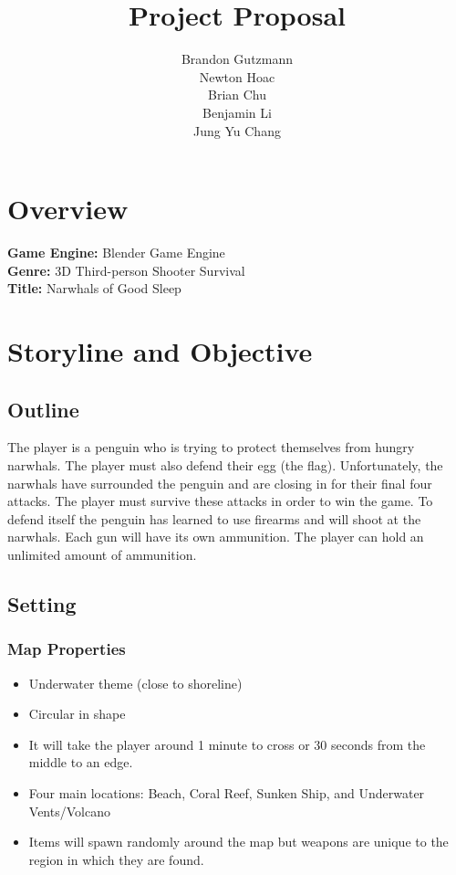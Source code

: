 \documentclass{article}
\title{Project Proposal}
\author{Brandon Gutzmann\\Newton Hoac\\Brian Chu\\Benjamin Li\\Jung Yu Chang}
\begin{document}
\maketitle
\tableofcontents
\section{Overview}
\textbf{Game Engine:} Blender Game Engine\\
\textbf{Genre:} 3D Third-person Shooter Survival\\
\textbf{Title:} Narwhals of Good Sleep

\section{Storyline and Objective}
\subsection{Outline}
The player is a penguin who is trying to protect themselves from hungry narwhals. The player must also defend their egg (the flag). Unfortunately, the narwhals have surrounded the penguin and are closing in for their final four attacks. The player must survive these attacks in order to win the game. To defend itself the penguin has learned to use firearms and will shoot at the narwhals. Each gun will have its own ammunition. The player can hold an unlimited amount of ammunition.

\subsection{Setting}
\subsubsection{Map Properties}
\begin{itemize}
\item Underwater theme (close to shoreline)
\item Circular in shape
\item It will take the player around 1 minute to cross or 30 seconds from the middle to an edge.
\item Four main locations: Beach, Coral Reef, Sunken Ship, and Underwater Vents/Volcano
\item Items will spawn randomly around the map but weapons are unique to the region in which they are found.
\end{itemize}
\end{document}
